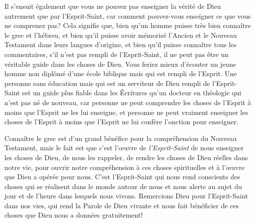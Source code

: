Il s'ensuit également que vous ne pouvez pas enseigner
 la vérité de Dieu autrement que par l'Esprit-Saint,
 car comment pouvez-vous enseigner ce que vous ne comprenez pas?
 Cela signifie que, bien qu'un homme puisse très bien connaître le grec et l'hébreu,
 et bien qu'il puisse avoir mémorisé l'Ancien
 et le Nouveau Testament dans leurs langues d'origine,
 et bien qu'il puisse connaître tous les commentaires,
 s'il n'est pas rempli de l'Esprit-Saint,
 il ne peut pas être un véritable guide dans les choses de Dieu.
 Vous feriez mieux d'écouter un jeune homme non diplômé
 d'une école biblique mais qui est rempli de l'Esprit.
 Une personne sans éducation mais qui est un serviteur de Dieu
 rempli de l'Esprit-Saint est un guide plus fiable
 dans les Écritures qu'un docteur en théologie
 qui n'est pas né de nouveau,
 car personne ne peut comprendre les choses de l'Esprit
 à moins que l'Esprit ne les lui enseigne,
 et personne ne peut vraiment enseigner les choses de l'Esprit
 à moins que l'Esprit ne lui confère l'onction pour enseigner.

Connaître le grec est d'un grand bénéfice pour la compréhension
 du Nouveau Testament, mais le fait est que c'est l'œuvre
 de \emph{l'Esprit-Saint} de nous enseigner les choses de Dieu,
 de nous les rappeler, de rendre les choses de Dieu réelles
 dans notre vie, pour ouvrir notre compréhension
 à ces choses spirituelles et à l'œuvre que Dieu a opérée pour nous.
 C'est l'Esprit-Saint qui nous rend conscients des choses
 qui se réalisent dans le monde autour de nous et nous alerte
 au sujet du jour et de l'heure dans lesquels nous vivons.
 Remercions Dieu pour l'Esprit-Saint dans nos vies,
 qui rend la Parole de Dieu vivante et nous fait bénéficier
 de ces choses que Dieu nous a données gratuitement!
\closechapter

